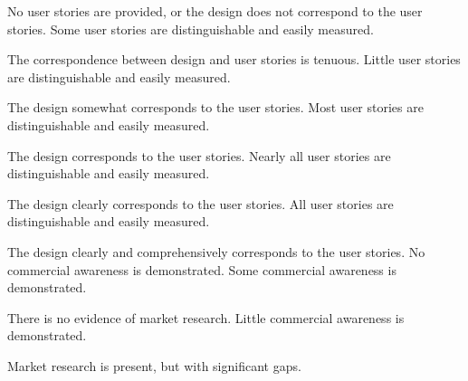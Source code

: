 \documentclass{../../fal_assignment}
\begin{document}
\rubricyeartwo

\begin{markingrubric}
%
        \grade\fail No user stories are provided, or the design does not correspond to the user stories.
        \grade Some user stories are distinguishable and easily measured.
            \par The correspondence between design and user stories is tenuous.
        \grade Little user stories are distinguishable and easily measured.
            \par The design somewhat corresponds to the user stories.
        \grade Most user stories are distinguishable and easily measured.
            \par The design corresponds to the user stories.
        \grade Nearly all user stories are distinguishable and easily measured.
            \par The design clearly corresponds to the user stories.
        \grade All user stories are distinguishable and easily measured.
            \par The design clearly and comprehensively corresponds to the user stories.
%
        \grade\fail No commercial awareness is demonstrated.
        \grade Some commercial awareness is demonstrated.
            \par There is no evidence of market research.
        \grade Little commercial awareness is demonstrated.
            \par Market research is present, but with significant gaps.

\end{markingrubric}
\end{document}
